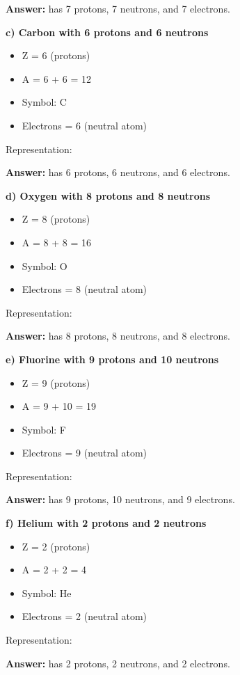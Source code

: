\begin{exercise}
\begin{solu}
        \textbf{Answer:}  has 7 protons, 7 neutrons, and 7 electrons.

        \textbf{c) Carbon with 6 protons and 6 neutrons}
        \begin{itemize}
            \item Z = 6 (protons)
            \item A = 6 + 6 = 12
            \item Symbol: C
            \item Electrons = 6 (neutral atom)
        \end{itemize}
        Representation: 

        \textbf{Answer:}  has 6 protons, 6 neutrons, and 6 electrons.

        \textbf{d) Oxygen with 8 protons and 8 neutrons}
        \begin{itemize}
            \item Z = 8 (protons)
            \item A = 8 + 8 = 16
            \item Symbol: O
            \item Electrons = 8 (neutral atom)
        \end{itemize}
        Representation: 

        \textbf{Answer:}  has 8 protons, 8 neutrons, and 8 electrons.

        \textbf{e) Fluorine with 9 protons and 10 neutrons}
        \begin{itemize}
            \item Z = 9 (protons)
            \item A = 9 + 10 = 19
            \item Symbol: F
            \item Electrons = 9 (neutral atom)
        \end{itemize}
        Representation: 

        \textbf{Answer:}  has 9 protons, 10 neutrons, and 9 electrons.

        \textbf{f) Helium with 2 protons and 2 neutrons}
        \begin{itemize}
            \item Z = 2 (protons)
            \item A = 2 + 2 = 4
            \item Symbol: He
            \item Electrons = 2 (neutral atom)
        \end{itemize}
        Representation: 

        \textbf{Answer:}  has 2 protons, 2 neutrons, and 2 electrons.
    \end{solu}
\end{exercise}
